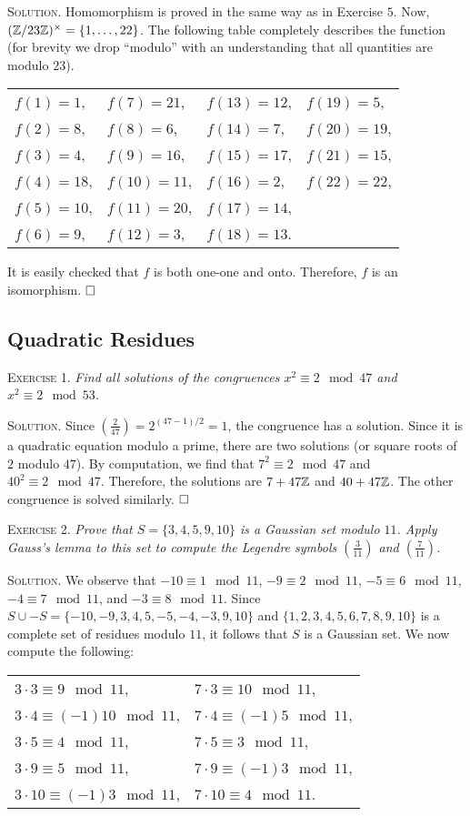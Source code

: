 \documentclass[11pt, leqno]{article}
\newcommand{\done}{\ensuremath{\hfill\square}}
\begin{document}
\textsc{Solution}. Homomorphism is proved in the same way as in Exercise $5$. Now, $(\mathbb{Z}/23\mathbb{Z})^{\times} = \{1, \ldots, 22\}$. The following table completely describes the function (for brevity we drop ``modulo'' with an understanding that all quantities are modulo $23$).
\begin{longtable}{p{6em} p{6em} p{6em} p{6em}}
  $f(1) = 1$, & $f(7) = 21$, & $f(13) = 12$, & $f(19) = 5$,\\
  $f(2) = 8$, & $f(8) = 6$, & $f(14) = 7$, & $f(20) = 19$,\\
  $f(3) = 4$, & $f(9) = 16$, & $f(15) = 17$, & $f(21) = 15$,\\
  $f(4) = 18$, & $f(10) = 11$, & $f(16) = 2$, & $f(22) = 22$,\\
  $f(5) = 10$, & $f(11) = 20$, & $f(17) = 14$, & \\
  $f(6) = 9$, & $f(12) = 3$, & $f(18) = 13$. & 
\end{longtable}
\reduce
It is easily checked that $f$ is both one-one and onto. Therefore, $f$ is an isomorphism. \done

\subsection{Quadratic Residues}

\textsc{Exercise 1}. \emph{Find all solutions of the congruences $x^2 \equiv 2 \mod 47$ and $x^2 \equiv 2 \mod 53$.}

\textsc{Solution}. Since $\left( \frac{2}{47} \right) = 2^{(47-1)/2} = 1$, the congruence has a solution. Since it is a quadratic equation modulo a prime, there are two solutions (or square roots of $2$ modulo $47$). By computation, we find that $7^2 \equiv 2 \mod 47$ and $40^2 \equiv 2 \mod 47$. Therefore, the solutions are $7+47\mathbb{Z}$ and $40+47\mathbb{Z}$. The other congruence is solved similarly. \done

\textsc{Exercise 2}. \emph{Prove that $S=\{3, 4, 5, 9, 10\}$ is a Gaussian set modulo $11$. Apply Gauss's lemma to this set to compute the Legendre symbols $\left(\frac{3}{11}\right)$ and $\left(\frac{7}{11}\right)$.}

\textsc{Solution}. We observe that $-10 \equiv 1 \mod 11$, $-9 \equiv 2 \mod 11$, $-5 \equiv 6 \mod 11$, $-4 \equiv 7 \mod 11$, and $-3 \equiv 8 \mod 11$. Since $S\cup -S = \{-10, -9, 3, 4, 5, -5, -4, -3, 9, 10\}$ and $\{1, 2, 3, 4, 5, 6, 7, 8, 9, 10\}$ is a complete set of residues modulo $11$, it follows that $S$ is a Gaussian set. We now compute the following:
\begin{longtable}{p{12em} p{12em}}
  $3 \cdot 3 \equiv 9 \mod 11$, & $7 \cdot 3 \equiv 10 \mod 11$,\\
  $3 \cdot 4 \equiv (-1)10 \mod 11$, & $7 \cdot 4 \equiv (-1)5 \mod 11$,\\
  $3 \cdot 5 \equiv 4 \mod 11$, & $7 \cdot 5 \equiv 3 \mod 11$,\\
  $3 \cdot 9 \equiv 5 \mod 11$, & $7 \cdot 9 \equiv (-1)3 \mod 11$,\\
  $3 \cdot 10 \equiv (-1)3 \mod 11$, & $7 \cdot 10 \equiv 4 \mod 11$.\\
\end{longtable}
\reduce
\end{document}
